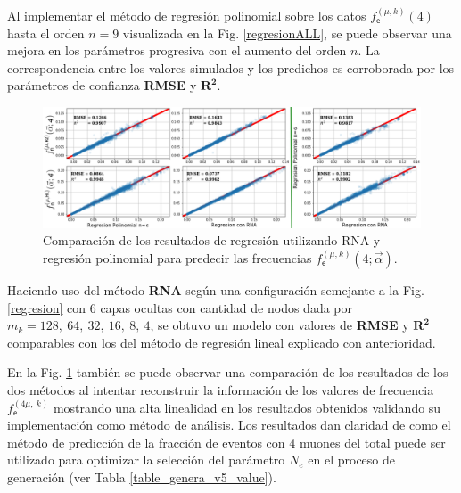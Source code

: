 Al implementar el método de regresión polinomial sobre los datos $f^{(\mu, k)}_\textsf{e} (4)$ hasta el orden $n = 9$ visualizada en la Fig. \ref{regresionALL}, se puede observar una mejora en los parámetros progresiva con el aumento del orden $n$. La correspondencia entre los valores simulados y los predichos es corroborada por los parámetros de confianza \textbf{RMSE} y $\mathbf{R^2}$. 
\begin{figure}[!ht]
\centering
\includegraphics[width=.9\textwidth]{Cap4/imagenes/ML_Entries.png}
\caption{Comparación de los resultados de regresión utilizando RNA y regresión polinomial para predecir las frecuencias $f^{(\mu, k)}_\textsf{e} (4; \vec{\alpha})$.}
\label{regresionALL1}
\end{figure}

Haciendo uso del método \textbf{RNA} según una configuración semejante a la Fig. \ref{regresion} con $6$ capas ocultas con cantidad de nodos dada por $m_k=128,~64,~32,~16,~8,~4$, se obtuvo un modelo con valores de \textbf{RMSE} y $\mathbf{R^2}$ comparables con los del método de regresión lineal explicado con anterioridad.

En la Fig. \ref{regresionALL1} también se puede observar una comparación de los resultados de los dos métodos al intentar reconstruir la información de los valores de frecuencia $f^{(4\mu,~k)}_\textsf{e}$ mostrando una alta linealidad en los resultados obtenidos validando su implementación como método de análisis. Los resultados dan claridad de como el método de predicción de la fracción de eventos con 4 muones del total puede ser utilizado para optimizar la selección del parámetro $N_e$ en el proceso de generación (ver Tabla \ref{table_genera_v5_value}).


%


